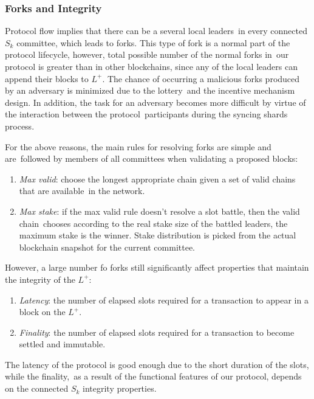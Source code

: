 \subsubsection{Forks and Integrity}\label{subsubsec:resolving-forks}

Protocol flow implies that there can be a several local leaders\
in every connected $S_k$ committee, which leads to forks.
This type of fork is a normal part of the protocol lifecycle, however, total possible number of the normal forks in\
our protocol is greater than in other blockchains, since any of the local leaders can append their blocks to $L^+$.
The chance of occurring a malicious forks produced by an adversary is minimized due to the lottery\
and the incentive mechanism design.
In addition, the task for an adversary becomes more difficult by virtue of the interaction between the protocol\
participants during the syncing shards process.

For the above reasons, the main rules for resolving forks are simple and are\
followed by members of all committees when validating a proposed blocks:
\begin{enumerate}
    \item \textit{Max valid}: choose the longest appropriate chain given a set of valid chains that are available\
    in the network.
    \item \textit{Max stake}: if the max valid rule doesn't resolve a slot battle, then the valid chain\
    chooses according to the real stake size of the battled leaders, the maximum stake is the winner.
    Stake distribution is picked from the actual blockchain snapshot for the current committee.
\end{enumerate}

However, a large number fo forks still significantly affect properties that maintain the integrity of the $L^+$:
\begin{enumerate}
    \item \textit{Latency}: the number of elapsed slots required for a transaction to appear in a block on the $L^+$.
    \item \textit{Finality}: the number of elapsed slots required for a transaction to become settled and immutable.
\end{enumerate}
The latency of the protocol is good enough due to the short duration of the slots, while the finality,\
as a result of the functional features of our protocol, depends on the connected $S_k$ integrity properties.

